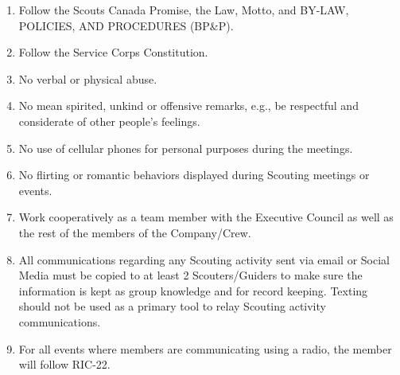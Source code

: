 \documentclass{Service_Corps_Document}
\begin{document}
    \def \Title {Code of Conduct}
    \def \Company {Service Corps}
    \def \versionNumber {3.1}
    \stdFooter
    \begin{titlepage}
        \stdTitlePage
    \end{titlepage}
    \begin{enumerate}
        \item Follow the Scouts Canada Promise, the Law, Motto, and BY-LAW, POLICIES, AND PROCEDURES (BP\&P).
        \item Follow the Service Corps Constitution.
        \item No verbal or physical abuse.
        \item No mean spirited, unkind or offensive remarks, e.g., be respectful and considerate of other people's feelings.
        \item No use of cellular phones for personal purposes during the meetings.
        \item No flirting or romantic behaviors displayed during Scouting meetings or events.
        \item Work cooperatively as a team member with the Executive Council as well as the rest of the members of the Company/Crew.
        \item All communications regarding any Scouting activity sent via email or Social Media must be copied to at least 2 Scouters/Guiders to make sure the information is kept as group knowledge and for record keeping.
        Texting should not be used as a primary tool to relay Scouting activity communications.
        \item For all events where members are communicating using a radio, the member will follow RIC-22.
    \end{enumerate}
\end{document}

